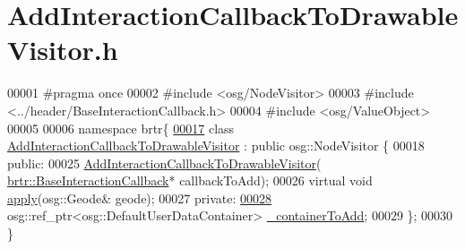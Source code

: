 \hypertarget{_add_interaction_callback_to_drawable_visitor_8h_source}{\section{Add\+Interaction\+Callback\+To\+Drawable\+Visitor.\+h}
\label{_add_interaction_callback_to_drawable_visitor_8h_source}
}

\begin{DoxyCode}
00001 \textcolor{preprocessor}{#pragma once}
00002 \textcolor{preprocessor}{#include <osg/NodeVisitor>}
00003 \textcolor{preprocessor}{#include <../header/BaseInteractionCallback.h>}
00004 \textcolor{preprocessor}{#include <osg/ValueObject>}
00005 
00006 \textcolor{keyword}{namespace }brtr\{
\hypertarget{_add_interaction_callback_to_drawable_visitor_8h_source_l00017}{}\hyperlink{classbrtr_1_1_add_interaction_callback_to_drawable_visitor}{00017}     \textcolor{keyword}{class }\hyperlink{classbrtr_1_1_add_interaction_callback_to_drawable_visitor}{AddInteractionCallbackToDrawableVisitor} : \textcolor{keyword}{public} 
      osg::NodeVisitor \{
00018     \textcolor{keyword}{public}:
00025         \hyperlink{classbrtr_1_1_add_interaction_callback_to_drawable_visitor_a8c1ecd3629ec4f97d4bc2a63c56683d4}{AddInteractionCallbackToDrawableVisitor}(
      \hyperlink{classbrtr_1_1_base_interaction_callback}{brtr::BaseInteractionCallback}* callbackToAdd);
00026         \textcolor{keyword}{virtual} \textcolor{keywordtype}{void} \hyperlink{classbrtr_1_1_add_interaction_callback_to_drawable_visitor_ace5d2fc7aa7c4a48f59e38728dac628a}{apply}(osg::Geode& geode);
00027     \textcolor{keyword}{private}:
\hypertarget{_add_interaction_callback_to_drawable_visitor_8h_source_l00028}{}\hyperlink{classbrtr_1_1_add_interaction_callback_to_drawable_visitor_ac23b4a99b1d35c2f7a32f048d4628927}{00028}         osg::ref\_ptr<osg::DefaultUserDataContainer> \hyperlink{classbrtr_1_1_add_interaction_callback_to_drawable_visitor_ac23b4a99b1d35c2f7a32f048d4628927}{\_containerToAdd};
00029     \};
00030 \}
\end{DoxyCode}
